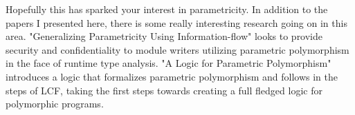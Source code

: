 Hopefully this has sparked your interest in parametricity. In addition to the papers I presented here, there is some really interesting research going on in this area. "Generalizing Parametricity Using Information-flow" \cite{infoFlow} looks to provide security and confidentiality to module writers utilizing parametric polymorphism in the face of runtime type analysis. "A Logic for Parametric Polymorphism" \cite{paraLogic} introduces a logic that formalizes parametric polymorphism and follows in the steps of LCF, taking the first steps towards creating a full fledged logic for polymorphic programs.
